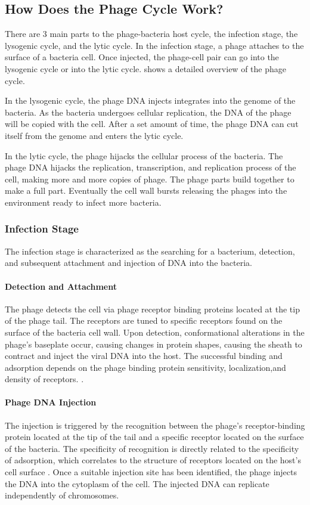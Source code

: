 \subsection{How Does the Phage Cycle Work?}
There are 3 main parts to the phage-bacteria host cycle, the infection stage, the lysogenic cycle, and the lytic cycle. 
In the infection stage, a phage attaches to the surface of a bacteria cell. 
Once injected, the phage-cell pair can go into the lysogenic cycle or into the lytic cycle. 
 shows a detailed overview of the phage cycle. 
\newline 

In the lysogenic cycle, the phage DNA injects integrates into the genome of the bacteria. 
As the bacteria undergoes cellular replication, the DNA of the phage will be copied with the cell. 
After a set amount of time, the phage DNA can cut itself from the genome and enters the lytic cycle.
\newline 

In the lytic cycle, the phage hijacks the cellular process of the bacteria. 
The phage DNA hijacks the replication, transcription, and replication process of the cell, making more and more copies of phage. 
The phage parts build together to make a full part. 
Eventually the cell wall bursts releasing the phages into the environment ready to infect more bacteria. 

\subsubsection{Infection Stage}
The infection stage is characterized as the searching for a bacterium, detection, and subsequent attachment and injection of DNA into the bacteria. 
\paragraph{Detection and Attachment}
The phage detects the cell via phage receptor binding proteins located at the tip of the phage tail. 
The receptors are tuned to specific receptors found on the surface of the bacteria cell wall. 
Upon detection, conformational alterations in the phage's baseplate occur, causing changes in protein shapes, causing the sheath to contract and inject the viral DNA into the host. 
The successful binding and adsorption depends on the phage binding protein sensitivity, localization,and density of receptors. \cite{stoneUnderstandingExploitingPhage2019}. 
\paragraph{Phage DNA Injection}
The injection is triggered by the recognition between the phage's receptor-binding protein located at the tip of the tail and a specific receptor located on the surface of the bacteria. 
The specificity of recognition is directly related to the specificity of adsorption, which correlates to the structure of receptors located on the host's cell surface \cite{stoneUnderstandingExploitingPhage2019}. 
Once a suitable injection site has been identified, the phage injects the DNA into the cytoplasm of the cell. 
The injected DNA can replicate independently of chromosomes. 

